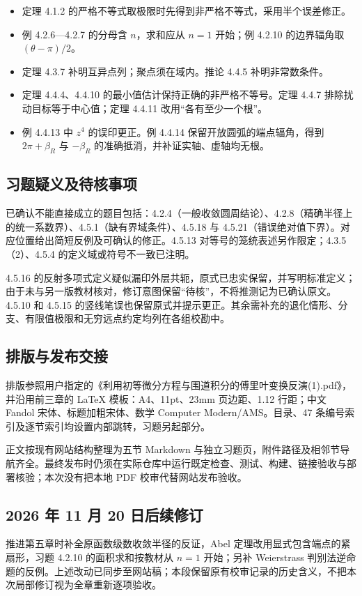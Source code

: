 \documentclass[11pt,a4paper]{article}
\providecommand{\tightlist}{\setlength{\itemsep}{3pt}\setlength{\parskip}{0pt}}
\begin{document}
\begin{itemize}
\tightlist
\item
  定理 4.1.2 的严格不等式取极限时先得到非严格不等式，采用半个误差修正。
\item
  例 4.2.6---4.2.7 的分母含 \(n\)，求和应从 \(n=1\) 开始；例 4.2.10
  的边界辐角取 \((\theta-\pi)/2\)。
\item
  定理 4.3.7 补明互异点列；聚点须在域内。推论 4.4.5 补明非常数条件。
\item
  定理 4.4.4、4.4.10 的最小值估计保持正确的非严格不等号。定理 4.4.7
  排除扰动目标等于中心值；定理 4.4.11 改用``各有至少一个根''。
\item
  例 4.4.13 中 \(z^4\) 的误印更正。例 4.4.14
  保留开放圆弧的端点辐角，得到 \(2\pi+\beta_R\) 与 \(-\beta_R\)
  的准确抵消，并补证实轴、虚轴均无根。
\end{itemize}

\subsection{习题疑义及待核事项}\label{ux4e60ux9898ux7591ux4e49ux53caux5f85ux6838ux4e8bux9879}

已确认不能直接成立的题目包括：4.2.4（一般收敛圆周结论）、4.2.8（精确半径上的统一系数界）、4.5.1（缺有界域条件）、4.5.18
与 4.5.21（错误绝对值下界）。对应位置给出简短反例及可确认的修正。4.5.13
对等号的笼统表述另作限定；4.3.5（2）、4.5.4 的定义域或符号不一致已注明。

4.5.16
的反射多项式定义疑似漏印外层共轭，原式已忠实保留，并写明标准定义；由于未与另一版教材核对，修订意图保留``待核''，不将推测记为已确认原文。4.5.10
和 4.5.15
的竖线笔误也保留原式并提示更正。其余需补充的退化情形、分支、有限值极限和无穷远点约定均列在各组校勘中。

\subsection{排版与发布交接}\label{ux6392ux7248ux4e0eux53d1ux5e03ux4ea4ux63a5}

排版参照用户指定的《利用初等微分方程与围道积分的傅里叶变换反演(1).pdf》，并沿用前三章的
LaTeX 模板：A4、11pt、23mm 页边距、1.12 行距；中文 Fandol
宋体、标题加粗宋体、数学 Computer Modern/AMS。目录、47
条编号索引及逐节索引均设置内部跳转，习题另起部分。

正文按现有网站结构整理为五节 Markdown
与独立习题页，附件路径及相邻节导航齐全。最终发布时仍须在实际仓库中运行既定检查、测试、构建、链接验收与部署核验；本次没有把本地
PDF 校审代替网站发布验收。



\subsection{2026 年 11 月 20 日后续修订}
推进第五章时补全原函数级数收敛半径的反证，Abel 定理改用显式包含端点的紧扇形，习题 4.2.10 的面积求和按教材从 \(n=1\) 开始；另补 Weierstrass 判别法逆命题的反例。上述改动已同步至网站稿；本段保留原有校审记录的历史含义，不把本次局部修订视为全章重新逐项验收。
\end{document}
